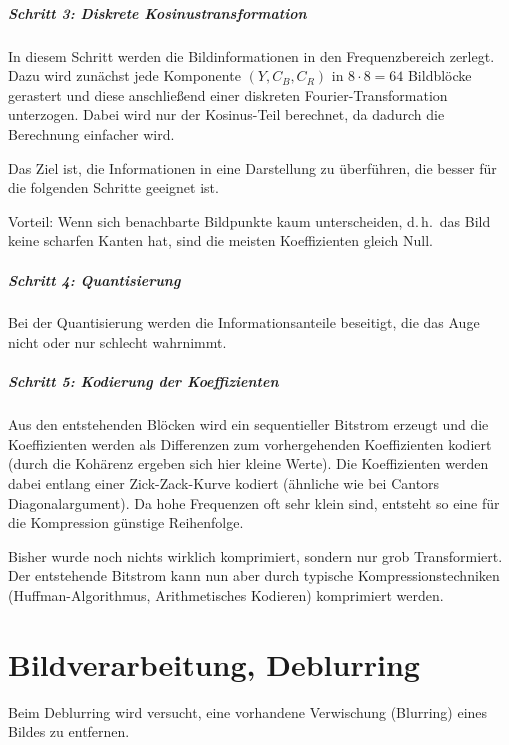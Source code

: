 \documentclass[a4paper, 11pt, accentcolor = tud3b]{tudreport}
\renewcommand{\dh}{d.\,h.~}
\begin{document}
					\paragraph{Schritt 3: Diskrete Kosinustransformation}
						In diesem Schritt werden die Bildinformationen in den Frequenzbereich zerlegt. Dazu wird zunächst jede Komponente \( (Y, C_B, C_R) \) in \( 8 \cdot 8 = 64 \) Bildblöcke gerastert und diese anschließend einer diskreten Fourier-Transformation unterzogen. Dabei wird nur der Kosinus-Teil berechnet, da dadurch die Berechnung einfacher wird.
						
						Das Ziel ist, die Informationen in eine Darstellung zu überführen, die besser für die folgenden Schritte geeignet ist.
						
						Vorteil: Wenn sich benachbarte Bildpunkte kaum unterscheiden, \dh das Bild keine scharfen Kanten hat, sind die meisten Koeffizienten gleich Null.

					\paragraph{Schritt 4: Quantisierung}
						Bei der Quantisierung werden die Informationsanteile beseitigt, die das Auge nicht oder nur schlecht wahrnimmt.

					\paragraph{Schritt 5: Kodierung der Koeffizienten}
						Aus den entstehenden Blöcken wird ein sequentieller Bitstrom erzeugt und die Koeffizienten werden als Differenzen zum vorhergehenden Koeffizienten kodiert (durch die Kohärenz ergeben sich hier kleine Werte). Die Koeffizienten werden dabei entlang einer Zick-Zack-Kurve kodiert (ähnliche wie bei Cantors Diagonalargument). Da hohe Frequenzen oft sehr klein sind, entsteht so eine für die Kompression günstige Reihenfolge.
						
						Bisher wurde noch nichts wirklich komprimiert, sondern nur grob Transformiert. Der entstehende Bitstrom kann nun aber durch typische Kompressionstechniken (Huffman-Algorithmus, Arithmetisches Kodieren) komprimiert werden.

	\chapter{Bildverarbeitung, Deblurring}
		Beim Deblurring wird versucht, eine vorhandene Verwischung (Blurring) eines Bildes zu entfernen.
	
\end{document}
